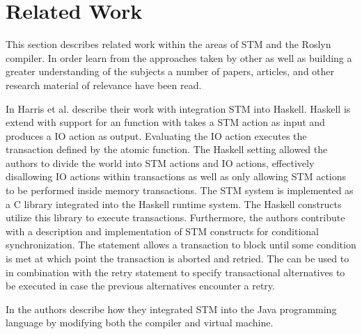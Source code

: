 \section{Related Work}
This section describes related work within the areas of \ac{STM} and the Roslyn compiler. In order learn from the approaches taken by other as well as building a greater understanding of the subjects a number of papers, articles, and other research material of relevance have been read. 

In \cite{harris2005composable} Harris et al. describe their work with integration \ac{STM} into Haskell. Haskell is extend with support for an  function with takes a \ac{STM} action as input and produces a \ac{IO} action as output\cite[p. 51]{harris2005composable}. Evaluating the IO action executes the transaction defined by the atomic function. The Haskell setting allowed the authors to divide the world into \ac{STM} actions and \ac{IO} actions\cite[p. 51]{harris2005composable}, effectively disallowing \ac{IO} actions within transactions as well as only allowing \ac{STM} actions to be performed inside memory transactions. The \ac{STM} system is implemented as a C library integrated into the Haskell runtime system. The Haskell constructs utilize this library to execute transactions\cite[p. 56]{harris2005composable}. Furthermore, the authors contribute with a description and implementation of \ac{STM} constructs for conditional synchronization. The  statement allows a transaction to block until some condition is met at which point the transaction is aborted and retried\cite[p. 52]{harris2005composable}. The  can be used to in combination with the retry statement to specify transactional alternatives to be executed in case the previous alternatives encounter a retry\cite[p. 52]{harris2005composable}.


In \cite{harris2003language} the authors describe how they integrated \ac{STM} into the Java programming language by modifying both the compiler\cite[p. 4]{harris2003language} and virtual machine\cite[p. 9]{harris2003language}.

\worksheetend